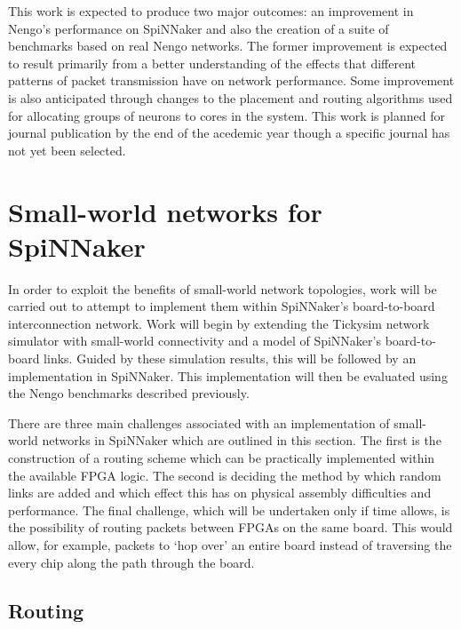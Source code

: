 		This work is expected to produce two major outcomes: an improvement in
		Nengo's performance on SpiNNaker and also the creation of a suite of
		benchmarks based on real Nengo networks. The former improvement is expected
		to result primarily from a better understanding of the effects that
		different patterns of packet transmission have on network performance. Some
		improvement is also anticipated through changes to the placement and routing
		algorithms used for allocating groups of neurons to cores in the system.
		This work is planned for journal publication by the end of the acedemic year
		though a specific journal has not yet been selected.
		
	
	\section{Small-world networks for SpiNNaker}
		
		
		In order to exploit the benefits of small-world network topologies, work
		will be carried out to attempt to implement them within SpiNNaker's
		board-to-board interconnection network. Work will begin by extending the
		Tickysim network simulator with small-world connectivity and a model of
		SpiNNaker's board-to-board links. Guided by these simulation results, this
		will be followed by an implementation in SpiNNaker.  This implementation
		will then be evaluated using the Nengo benchmarks described previously.
		
		There are three main challenges associated with an implementation of
		small-world networks in SpiNNaker which are outlined in this section. The
		first is the construction of a routing scheme which can be practically
		implemented within the available FPGA logic. The second is deciding the
		method by which random links are added and which effect this has on physical
		assembly difficulties and performance. The final challenge, which will be
		undertaken only if time allows, is the possibility of routing packets
		between FPGAs on the same board. This would allow, for example, packets to
		`hop over' an entire board instead of traversing the every chip along the
		path through the board.
		
		\subsection{Routing}
			
